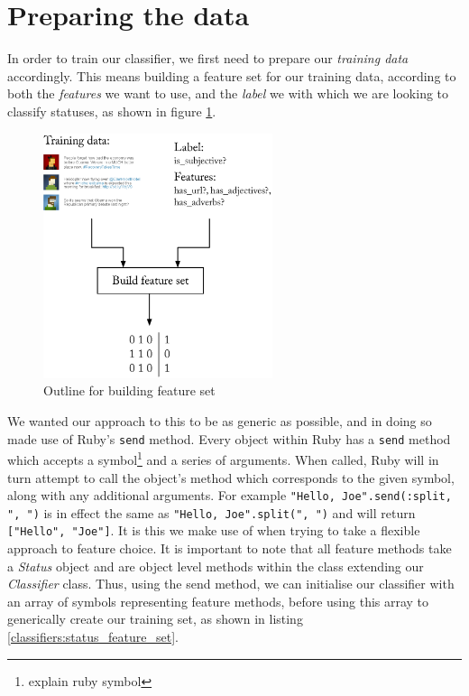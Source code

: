\section{Preparing the data}
\label{classifiers:preparing_data}

In order to train our classifier, we first need to prepare our \emph{training data} accordingly. This means building a feature set for our training data, according to both the \emph{features} we want to use, and the \emph{label} we with which we are looking to classify statuses, as shown in figure \ref{fig:building_feature_set}.

\begin{figure}[h!]
	\caption{Outline for building feature set}
	\label{fig:building_feature_set}
	\centering
		\includegraphics[width=0.6\textwidth]{figures/build_training_data.eps}
\end{figure}

We wanted our approach to this to be as generic as possible, and in doing so made use of Ruby's \texttt{send} method. Every object within Ruby has a \texttt{send} method which accepts a symbol\footnote{explain ruby symbol} and a series of arguments. When called, Ruby will in turn attempt to call the object's method which corresponds to the given symbol, along with any additional arguments. For example \texttt{"Hello, Joe".send(:split, ", ")} is in effect the same as \texttt{"Hello, Joe".split(", ")} and will return \texttt{["Hello", "Joe"]}. It is this we make use of when trying to take a flexible approach to feature choice. It is important to note that all feature methods take a \emph{Status} object and are object level methods within the class extending our \emph{Classifier} class. Thus, using the send method, we can initialise our classifier with an array of symbols representing feature methods, before using this array to generically create our training set, as shown in listing \ref{classifiers:status_feature_set}.

